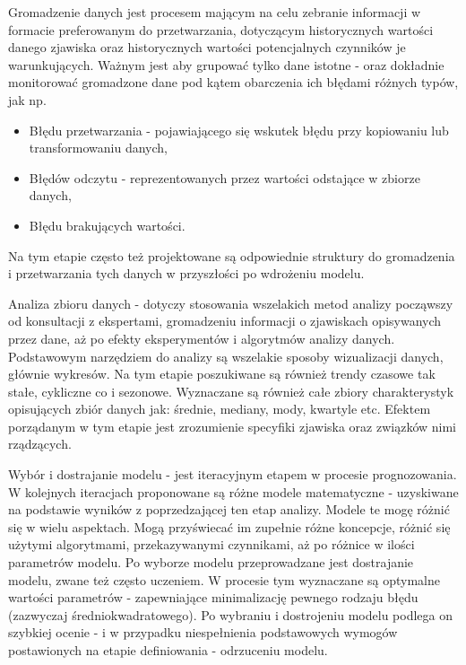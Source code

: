 \documentclass[10pt,a4paper]{book}
\begin{document}
Gromadzenie danych jest procesem mającym na celu zebranie informacji w formacie preferowanym do przetwarzania, dotyczącym historycznych wartości danego zjawiska oraz historycznych wartości potencjalnych czynników je warunkujących. Ważnym jest aby grupować tylko dane istotne - oraz dokładnie monitorować gromadzone dane pod kątem obarczenia ich błędami różnych typów, jak np.
\begin{itemize}
\item Błędu przetwarzania - pojawiającego się wskutek błędu przy kopiowaniu lub transformowaniu danych,
\item Błędów odczytu - reprezentowanych przez wartości odstające w zbiorze danych, 
\item Błędu brakujących wartości. 
\end{itemize}
Na tym etapie często też projektowane są odpowiednie struktury do gromadzenia i przetwarzania tych danych w przyszłości po wdrożeniu modelu.

Analiza zbioru danych - dotyczy stosowania wszelakich metod analizy począwszy od konsultacji z ekspertami, gromadzeniu informacji o zjawiskach opisywanych przez dane, aż po efekty eksperymentów i algorytmów analizy danych. Podstawowym narzędziem do analizy są wszelakie sposoby wizualizacji danych, głównie wykresów. Na tym etapie poszukiwane są również trendy czasowe tak stałe, cykliczne co i sezonowe. Wyznaczane są również całe zbiory charakterystyk opisujących zbiór danych jak: średnie, mediany, mody, kwartyle etc. Efektem porządanym w tym etapie jest zrozumienie specyfiki zjawiska oraz związków nimi rządzących.

Wybór i dostrajanie modelu  - jest iteracyjnym etapem w procesie prognozowania. W kolejnych iteracjach proponowane są różne modele matematyczne - uzyskiwane na podstawie wyników z poprzedzającej ten etap analizy. Modele te mogę różnić się w wielu aspektach. Mogą przyświecać im zupełnie różne koncepcje, różnić się użytymi algorytmami, przekazywanymi czynnikami, aż po różnice w ilości parametrów modelu. Po wyborze modelu przeprowadzane jest dostrajanie modelu, zwane też często uczeniem. W procesie tym wyznaczane są optymalne wartości parametrów - zapewniające minimalizację pewnego rodzaju błędu (zazwyczaj średniokwadratowego). Po wybraniu i dostrojeniu modelu podlega on szybkiej ocenie - i w przypadku niespełnienia podstawowych wymogów postawionych na etapie definiowania - odrzuceniu modelu.
\end{document}
